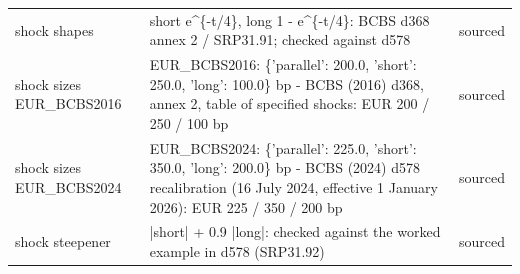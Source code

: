 \begin{table}[H]
\begin{tabular}{>{\raggedright\arraybackslash}p{3.0cm}>{\raggedright\arraybackslash}p{10.6cm}>{\raggedright\arraybackslash}p{2.1cm}}
shock shapes & short e\textasciicircum{}\{-t/4\}, long 1 - e\textasciicircum{}\{-t/4\}: BCBS d368 annex 2 / SRP31.91; checked against d578 & sourced \\
shock sizes EUR\_BCBS2016 & EUR\_BCBS2016: \{'parallel': 200.0, 'short': 250.0, 'long': 100.0\} bp - BCBS (2016) d368, annex 2, table of specified shocks: EUR 200 / 250 / 100 bp & sourced \\
shock sizes EUR\_BCBS2024 & EUR\_BCBS2024: \{'parallel': 225.0, 'short': 350.0, 'long': 200.0\} bp - BCBS (2024) d578 recalibration (16 July 2024, effective 1 January 2026): EUR 225 / 350 / 200 bp & sourced \\
shock steepener & -0.65 |short| + 0.9 |long|: checked against the worked example in d578 (SRP31.92) & sourced \\
\bottomrule
\end{tabular}
\end{table}

